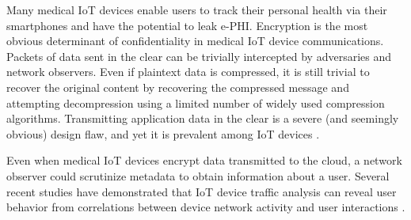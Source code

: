 
Many medical IoT devices enable users to track their personal health via their smartphones and have the potential to leak e-PHI. 
Encryption is the most obvious determinant of confidentiality in medical IoT device communications. Packets of data sent in the clear can be trivially intercepted by adversaries and network observers. Even if plaintext data is compressed, it is still trivial to recover the original content by recovering the compressed message and attempting decompression using a limited number of widely used compression algorithms. 
Transmitting application data in the clear is a severe (and seemingly obvious) design flaw, and yet it is prevalent among IoT devices \cite{}. 

Even when medical IoT devices encrypt data transmitted to the cloud, a network observer could scrutinize metadata to obtain information about a user.  Several recent studies have demonstrated that IoT device traffic analysis can reveal user behavior  from correlations between device network activity and user interactions \cite{}.  

